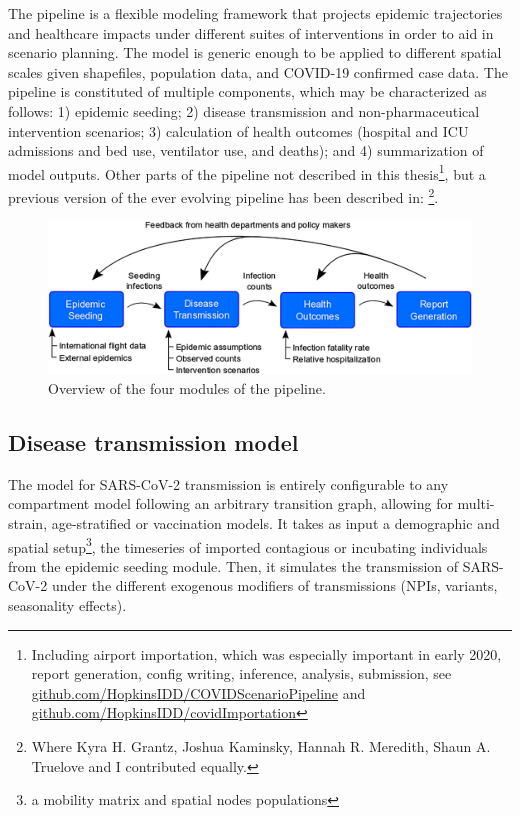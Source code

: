 The pipeline is a flexible modeling framework that projects epidemic trajectories and healthcare impacts under different suites of interventions in order to aid in scenario planning. The model is generic enough to be applied to different spatial scales given shapefiles, population data, and COVID-19 confirmed case data. The pipeline is constituted of multiple components, which may be characterized as follows: 1) epidemic seeding; 2) disease transmission and non-pharmaceutical intervention scenarios; 3) calculation of health outcomes (hospital and ICU admissions and bed use, ventilator use, and deaths); and 4) summarization of model outputs.
 Other parts of the pipeline not described in this thesis\footnote[][-4\baselineskip]{Including airport importation, which was especially important in early 2020, report generation, config writing, inference, analysis, submission, see \eg \url{github.com/HopkinsIDD/COVIDScenarioPipeline} and \url{github.com/HopkinsIDD/covidImportation}}, but a previous version of the ever evolving pipeline has been described in:
\footnote[][-2\baselineskip]{Where Kyra H. Grantz, Joshua Kaminsky, Hannah R. Meredith, Shaun A. Truelove and I contributed equally.}.
\begin{figure}[!htb]%
    \centering
    \includegraphics{fig_pipeline/fig1a}
    \caption[The four modules of the pipeline]{Overview of the four modules of the pipeline.}
    \label{fig:pipeline-modules}
\end{figure}

\subsection{Disease transmission model}
The model for SARS-CoV-2 transmission is entirely configurable to any compartment model following an arbitrary transition graph, allowing for multi-strain, age-stratified or vaccination models. It takes as input a demographic and spatial setup\footnote{\ie a mobility matrix and spatial nodes populations}, the timeseries of imported contagious or incubating individuals from the epidemic seeding module. Then, it simulates the transmission of SARS-CoV-2 under the different exogenous modifiers of transmissions (NPIs, variants, seasonality effects). 

